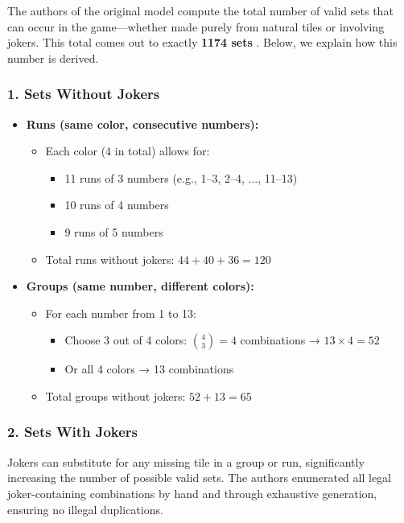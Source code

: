 \documentclass[11pt,letterpaper]{article}
\begin{document}
The authors of the original model compute the total number of valid sets that can occur in the game---whether made purely from natural tiles or involving jokers. This total comes out to exactly \textbf{1174 sets} \cite{den2006solving}. Below, we explain how this number is derived.

\subsubsection*{1. Sets Without Jokers}

\begin{itemize}
    \item \textbf{Runs (same color, consecutive numbers):}
    \begin{itemize}
        \item Each color (4 in total) allows for:
        \begin{itemize}
            \item 11 runs of 3 numbers (e.g., 1--3, 2--4, ..., 11--13)
            \item 10 runs of 4 numbers
            \item 9 runs of 5 numbers
        \end{itemize}
        \item Total runs without jokers: $44 + 40 + 36 = 120$
    \end{itemize}

    \item \textbf{Groups (same number, different colors):}
    \begin{itemize}
        \item For each number from 1 to 13:
        \begin{itemize}
            \item Choose 3 out of 4 colors: $\binom{4}{3} = 4$ combinations → $13 \times 4 = 52$
            \item Or all 4 colors → 13 combinations
        \end{itemize}
        \item Total groups without jokers: $52 + 13 = 65$
    \end{itemize}
\end{itemize}

\subsubsection*{2. Sets With Jokers}

Jokers can substitute for any missing tile in a group or run, significantly increasing the number of possible valid sets. The authors enumerated all legal joker-containing combinations by hand and through exhaustive generation, ensuring no illegal duplications.
\end{document}

